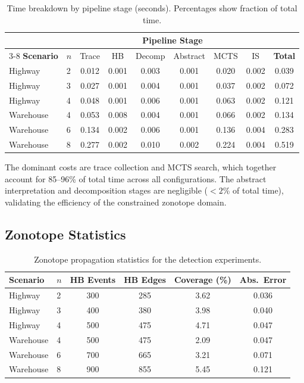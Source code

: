 \documentclass[11pt]{article}
\begin{document}
\begin{table}[h]
\centering
\caption{Time breakdown by pipeline stage (seconds). Percentages show
fraction of total time.}
\label{tab:time-breakdown}
\begin{tabular}{@{}llccccccc@{}}
\toprule
& & \multicolumn{6}{c}{\textbf{Pipeline Stage}} & \\
\cmidrule(lr){3-8}
\textbf{Scenario} & $n$ & Trace & HB & Decomp & Abstract & MCTS & IS & \textbf{Total} \\
\midrule
Highway & 2 & 0.012 & 0.001 & 0.003 & 0.001 & 0.020 & 0.002 & 0.039 \\
Highway & 3 & 0.027 & 0.001 & 0.004 & 0.001 & 0.037 & 0.002 & 0.072 \\
Highway & 4 & 0.048 & 0.001 & 0.006 & 0.001 & 0.063 & 0.002 & 0.121 \\
\midrule
Warehouse & 4 & 0.053 & 0.008 & 0.004 & 0.001 & 0.066 & 0.002 & 0.134 \\
Warehouse & 6 & 0.134 & 0.002 & 0.006 & 0.001 & 0.136 & 0.004 & 0.283 \\
Warehouse & 8 & 0.277 & 0.002 & 0.010 & 0.002 & 0.224 & 0.004 & 0.519 \\
\bottomrule
\end{tabular}
\end{table}

The dominant costs are trace collection and MCTS search, which together
account for 85--96\% of total time across all configurations. The abstract
interpretation and decomposition stages are negligible ($<2$\% of total time),
validating the efficiency of the constrained zonotope domain.

\subsection{Zonotope Statistics}

\begin{table}[h]
\centering
\caption{Zonotope propagation statistics for the detection experiments.}
\label{tab:zonotope-stats}
\begin{tabular}{@{}llcccc@{}}
\toprule
\textbf{Scenario} & $n$ & \textbf{HB Events} & \textbf{HB Edges} & \textbf{Coverage (\%)} & \textbf{Abs.\ Error} \\
\midrule
Highway & 2 & 300 & 285 & 3.62 & 0.036 \\
Highway & 3 & 400 & 380 & 3.98 & 0.040 \\
Highway & 4 & 500 & 475 & 4.71 & 0.047 \\
\midrule
Warehouse & 4 & 500 & 475 & 2.09 & 0.047 \\
Warehouse & 6 & 700 & 665 & 3.21 & 0.071 \\
Warehouse & 8 & 900 & 855 & 5.45 & 0.121 \\
\bottomrule
\end{tabular}
\end{table}
\end{document}
